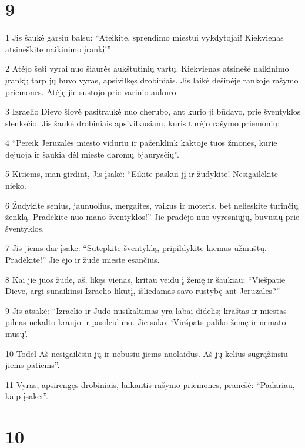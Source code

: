 \chapter{9}


\par 1 Jis šaukė garsiu balsu: “Ateikite, sprendimo miestui vykdytojai! Kiekvienas atsineškite naikinimo įrankį!” 
\par 2 Atėjo šeši vyrai nuo šiaurės aukštutinių vartų. Kiekvienas atsinešė naikinimo įrankį; tarp jų buvo vyras, apsivilkęs drobiniais. Jis laikė dešinėje rankoje rašymo priemones. Atėję jie sustojo prie varinio aukuro. 
\par 3 Izraelio Dievo šlovė pasitraukė nuo cherubo, ant kurio ji būdavo, prie šventyklos slenksčio. Jis šaukė drobiniais apsivilkusiam, kuris turėjo rašymo priemonių: 
\par 4 “Pereik Jeruzalės miesto viduriu ir paženklink kaktoje tuos žmones, kurie dejuoja ir šaukia dėl mieste daromų bjaurysčių”. 
\par 5 Kitiems, man girdint, Jis įsakė: “Eikite paskui jį ir žudykite! Nesigailėkite nieko. 
\par 6 Žudykite senius, jaunuolius, mergaites, vaikus ir moteris, bet nelieskite turinčių ženklą. Pradėkite nuo mano šventyklos!” Jie pradėjo nuo vyresniųjų, buvusių prie šventyklos. 
\par 7 Jis jiems dar įsakė: “Sutepkite šventyklą, pripildykite kiemus užmuštų. Pradėkite!” Jie ėjo ir žudė mieste esančius. 
\par 8 Kai jie juos žudė, aš, likęs vienas, kritau veidu į žemę ir šaukiau: “Viešpatie Dieve, argi sunaikinsi Izraelio likutį, išliedamas savo rūstybę ant Jeruzalės?” 
\par 9 Jis atsakė: “Izraelio ir Judo nusikaltimas yra labai didelis; kraštas ir miestas pilnas nekalto kraujo ir pasileidimo. Jie sako: ‘Viešpats paliko žemę ir nemato mūsų’. 
\par 10 Todėl Aš nesigailėsiu jų ir nebūsiu jiems nuolaidus. Aš jų kelius sugrąžinsiu jiems patiems”. 
\par 11 Vyras, apsirengęs drobiniais, laikantis rašymo priemones, pranešė: “Padariau, kaip įsakei”.



\chapter{10}


